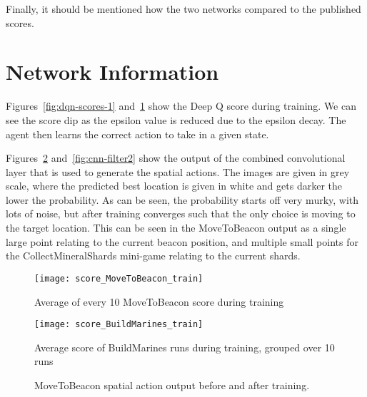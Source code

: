 Finally, it should be mentioned how the two networks compared to the published
scores. %

\section{Network Information}

Figures~\ref{fig:dqn-scores-1} and~\ref{fig:dqn-scores-2} show the Deep Q score
during training. We can see the score dip as the epsilon value is reduced due to
the epsilon decay. The agent then learns the correct action to take in a given
state.

Figures~\ref{fig:cnn-filter1} and~\ref{fig:cnn-filter2} show the output of the
combined convolutional layer that is used to generate the spatial actions. The
images are given in grey scale, where the predicted best location is given in
white and gets darker the lower the probability. As can be seen, the
probability starts off very murky, with lots of noise, but after training
converges such that the only choice is moving to the target location. This can
be seen in the MoveToBeacon output as a single large point relating to the
current beacon position, and multiple small points for the CollectMineralShards
mini-game relating to the current shards.

\begin{figure}[h]
  \centering
  \begin{minipage}[b]{0.45\textwidth}
    \texttt{[image: score\_MoveToBeacon\_train]}
    \caption{Average of every 10 MoveToBeacon score during training}%
    \label{fig:dqn-scores-1}%
  \end{minipage}
  \hfill
  \begin{minipage}[b]{0.45\textwidth}
    \texttt{[image: score\_BuildMarines\_train]}
    \caption{Average score of BuildMarines runs during training, grouped over 10
    runs}%
    \label{fig:dqn-scores-2}
  \end{minipage}
\end{figure}

\begin{figure}[h]
    \centering
    \caption{MoveToBeacon spatial action output before and after training.}%
    \label{fig:cnn-filter1}%
\end{figure}

